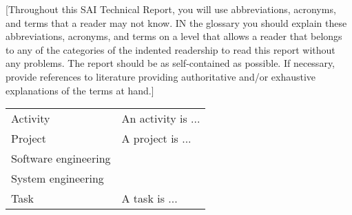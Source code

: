 [Throughout this SAI Technical Report, you will use abbreviations, acronyms, and terms that a reader may not know. IN the glossary you should explain these abbreviations, acronyms, and terms on a level that allows a reader that belongs to any of the categories of the indented readership to read this report without any problems. The report should be as self-contained as possible. If necessary, provide references to literature providing authoritative and/or exhaustive explanations of the terms at hand.]

\begin{longtable}{L{4cm}J{10cm}}
    Activity 				& An activity is ... \\
    Project 				& A project is ... \\
    Software engineering	 & ~ \\
    System engineering 	& ~ \\
    Task 					& A task is ... \\
\end{longtable}